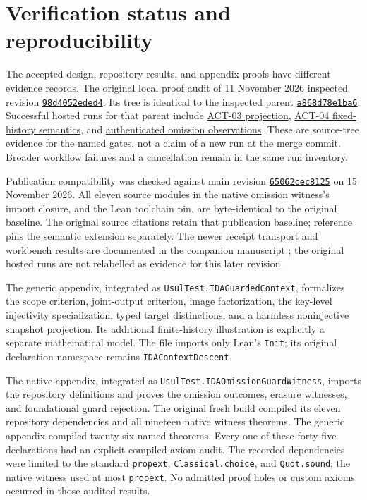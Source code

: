 \documentclass[11pt]{article}
\newcommand{\run}[2]{\href{https://github.com/larsbx/usul-al-fiqh-deontic-circuits/actions/runs/#1}{#2}}
\begin{document}
\section{Verification status and reproducibility}

The accepted design, repository results, and appendix proofs have different evidence records. The original local proof audit of 11 November 2026 inspected revision
\href{https://github.com/larsbx/usul-al-fiqh-deontic-circuits/commit/98d4052eded4063c9cb928c87120f44aa628f23d}{\texttt{98d4052eded4}}.
Its tree is identical to the inspected parent
\href{https://github.com/larsbx/usul-al-fiqh-deontic-circuits/commit/a868d78e1ba6f6f0440ec32b68d1a06a8393b726}{\texttt{a868d78e1ba6}}.
Successful hosted runs for that parent include
\run{43053122574}{ACT-03 projection},
\run{43053122470}{ACT-04 fixed-history semantics}, and
\run{43053122778}{authenticated omission observations}.
These are source-tree evidence for the named gates, not a claim of a new run at the merge commit. Broader workflow failures and a cancellation remain in the same run inventory.

Publication compatibility was checked against main revision
\href{https://github.com/larsbx/usul-al-fiqh-deontic-circuits/commit/65062cec81255be893cba2fd722c99c904d8eec2}{\texttt{65062cec8125}} on 15 November 2026. All eleven source modules in the native omission witness's import closure, and the Lean toolchain pin, are byte-identical to the original baseline. The original source citations retain that publication baseline; reference~\cite{omission-semantics} pins the semantic extension separately. The newer receipt transport and workbench results are documented in the companion manuscript \cite{companion}; the original hosted runs are not relabelled as evidence for this later revision.

The generic appendix, integrated as \texttt{UsulTest.\allowbreak{}IDAGuardedContext}, formalizes the scope criterion, joint-output criterion, image factorization, the key-level injectivity specialization, typed target distinctions, and a harmless noninjective snapshot projection. Its additional finite-history illustration is explicitly a separate mathematical model. The file imports only Lean's \texttt{Init}; its original declaration namespace remains \texttt{IDAContextDescent}.

The native appendix, integrated as \texttt{UsulTest.\allowbreak{}IDAOmissionGuardWitness}, imports the repository definitions and proves the omission outcomes, erasure witnesses, and foundational guard rejection. The original fresh build compiled its eleven repository dependencies and all nineteen native witness theorems. The generic appendix compiled twenty-six named theorems. Every one of these forty-five declarations had an explicit compiled axiom audit. The recorded dependencies were limited to the standard \texttt{propext}, \texttt{Classical.choice}, and \texttt{Quot.sound}; the native witness used at most \texttt{propext}. No admitted proof holes or custom axioms occurred in those audited results.
\end{document}
